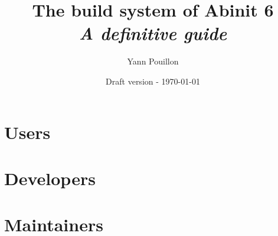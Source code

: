 \documentclass[12pt,a4paper,english,openright]{scrbook}
\title{The build system of Abinit 6 \\
\textit{A definitive guide}}
\author{Yann Pouillon}
\date{Draft version - \today}
\begin{document}
\frontmatter
\mainmatter
\tableofcontents{}


\part{Users}


 


\part{Developers}


 


\part{Maintainers}

 

\backmatter
\end{document}
